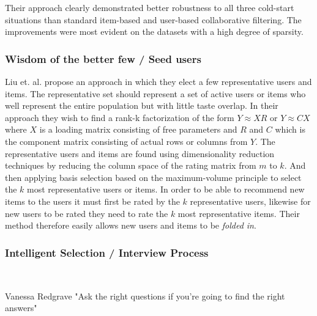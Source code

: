 Their approach clearly demonstrated better robustness to all three cold-start situations than standard item-based
and user-based collaborative filtering. The improvements were most evident on
the datasets with a high degree of sparsity.


\subsubsection{Wisdom of the better few / Seed users}


Liu et. al. \cite{Liu2011} propose an approach in which they elect a few
representative users and items. The representative set should represent a set
of active users or items who well represent the entire population but with
little taste overlap. In their approach they wish to find a rank-k
factorization of the form $Y \approx XR$ or $Y \approx CX$ where $X$ is a
loading matrix consisting of free parameters and $R$ and $C$ which is the
component matrix consisting of actual rows or columns from $Y$. The
representative users and items are found using dimensionality reduction
techniques by reducing the column space of the rating matrix from $m$ to $k$.
And then applying basis selection based on the maximum-volume principle to
select the $k$ most representative users or items. In order to be able to
recommend new items to the users it must first be rated by the $k$
representative users, likewise for new users to be rated they need to rate the
$k$ most representative items. Their method therefore easily allows new users
and items to be \emph{folded in}.


\subsubsection{Intelligent Selection / Interview Process}\mbox{}\\


\begin{chapquote}[30pt]{Vanessa Redgrave}
  "Ask the right questions if you're going to find the right answers"
\end{chapquote}

